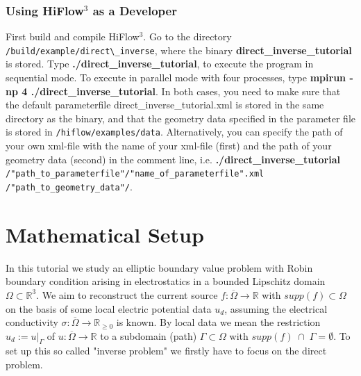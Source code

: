 \documentclass[a4paper, 11pt, twoside]{article}
\begin{document}
\subsubsection{Using HiFlow$^3$ as a Developer}\label{sectiondeveloper}
First build and compile HiFlow$^3$. Go to the directory \verb'/build/example/direct\_inverse', where the binary \textbf{direct\_inverse\_tutorial} is stored. Type \textbf{./direct\_inverse\_tutorial}, to execute the program in sequential mode. To execute in parallel mode  with four processes, type \textbf{mpirun -np 4 ./direct\_inverse\_tutorial}. In both cases, you need to make sure that the default parameterfile direct\_inverse\_tutorial.xml is stored in the same directory as the binary, and that the geometry data specified in the parameter file is stored in \verb'/hiflow/examples/data'. Alternatively, you can specify the path of your own xml-file with the name of your xml-file (first) and the path of your geometry data (second) in the comment line, i.e. \textbf{./direct\_inverse\_tutorial} \verb'/"path_to_parameterfile"/"name_of_parameterfile".xml' \verb'/"path_to_geometry_data"/'.

\section{Mathematical Setup}
%
In this tutorial we study an elliptic boundary value problem with Robin boundary condition arising in electrostatics  in a bounded Lipschitz domain $\Omega\subset\mathbb{R}^3$. We aim to reconstruct the current source $f:\overline{\Omega}\to\mathbb{R}$ with $supp(f)\subset\Omega$ on the basis of some local electric potential data $u_d$, assuming the electrical conductivity $\sigma:\overline{\Omega}\to\mathbb{R}_{\ge 0}$ is known. By local data we mean the restriction $u_d:=u|_{\Gamma}$ of $u:\overline{\Omega}\to\mathbb{R}$ to a subdomain (path) $\Gamma\subset\Omega$ with $supp(f)\;\cap\;\Gamma=\emptyset$. To set up this so called "inverse problem" we firstly have to focus on the direct problem.
\end{document}
